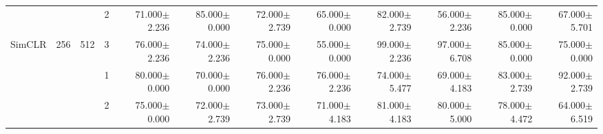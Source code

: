 \begin{table}[htpb]
{\begin{tabular}{c|c|c|c|rr|rr|rr|rr}
                                 &                                                                                 &                                                                                        & 2                                                                                         & 71.000$\pm$2.236                        & 85.000$\pm$0.000                        & 72.000$\pm$2.739                        & 65.000$\pm$0.000                        & 82.000$\pm$2.739                         & 56.000$\pm$2.236                         & 85.000$\pm$0.000                        & 67.000$\pm$5.701                       \\
\multirow{-12}{*}{SimCLR}        & \multirow{-6}{*}{256}                                                           & \multirow{-3}{*}{512}                                                                  & 3                                                                                         & 76.000$\pm$2.236                        & 74.000$\pm$2.236                        & 75.000$\pm$0.000                        & 55.000$\pm$0.000                        & 99.000$\pm$2.236                         & 97.000$\pm$6.708                         & 85.000$\pm$0.000                        & 75.000$\pm$0.000                       \\ \hline
                                 &                                                                                 &                                                                                        & 1                                                                                         & 80.000$\pm$0.000                        & 70.000$\pm$0.000                        & 76.000$\pm$2.236                        & 76.000$\pm$2.236                        & 74.000$\pm$5.477                         & 69.000$\pm$4.183                         & 83.000$\pm$2.739                        & 92.000$\pm$2.739                       \\
                                 &                                                                                 &                                                                                        & 2                                                                                         & 75.000$\pm$0.000                        & 72.000$\pm$2.739                        & 73.000$\pm$2.739                        & 71.000$\pm$4.183                        & 81.000$\pm$4.183                         & 80.000$\pm$5.000                         & 78.000$\pm$4.472                        & 64.000$\pm$6.519                       \\

\end{tabular}}
\end{table}
